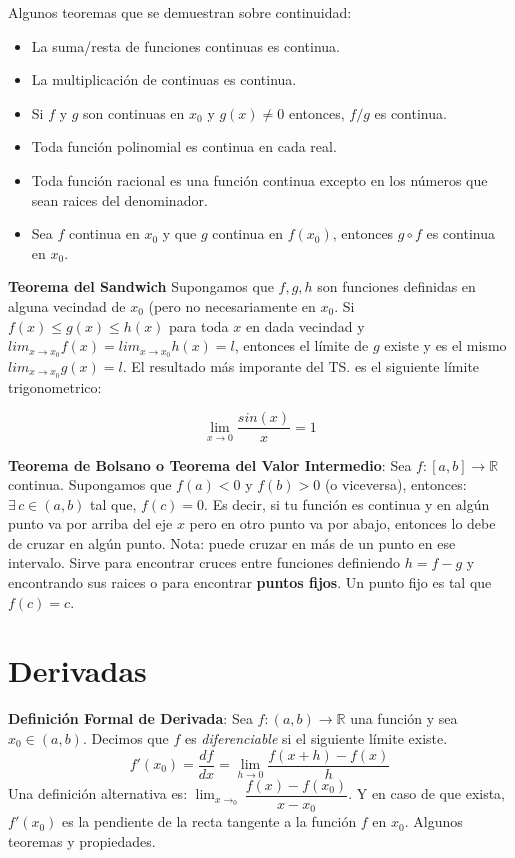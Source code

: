 \documentclass[pdftex,11pt,a4paper]{article}
\begin{document}
\begin{itemize}
Algunos teoremas que se demuestran sobre continuidad:

\begin{itemize}
	\item La suma/resta de funciones continuas es continua.
	\item La multiplicación de continuas es continua.
	\item Si $f$ y $g$ son continuas en $x_0$ y $g(x) \neq 0$ entonces, $f/g$ es continua.
	\item Toda función polinomial es continua en cada real.
	\item Toda función racional es una función continua excepto en los números que sean raices del denominador.
	\item Sea $f$ continua en $x_0$ y que $g$ continua en $f(x_0)$, entonces $g\circ f$ es continua en $x_0$. 
\end{itemize}

\textbf{Teorema del Sandwich} Supongamos que $f,g,h$ son funciones definidas en alguna vecindad de $x_0$ (pero no necesariamente en $x_0$. Si $f(x)\leq g(x) \leq h(x)$ para toda $x$ en dada vecindad y $lim_{x\rightarrow x_0}f(x) = lim_{x\rightarrow x_0}h(x) = l$, entonces el límite de $g$ existe y es el mismo $lim_{x\rightarrow x_0}g(x) = l$. El resultado más imporante del TS. es el siguiente límite trigonometrico:

$$\lim_{x \rightarrow 0} \dfrac{sin(x)}{x} = 1$$

\textbf{Teorema de Bolsano o Teorema del Valor Intermedio}: Sea $f:[a,b]\rightarrow \mathbb{R}$ continua. Supongamos que $f(a)<0$ y $f(b) > 0$ (o viceversa), entonces: $\exists \,c \in (a,b)$ tal que, $f(c) = 0$. Es decir, si tu función es continua y en algún punto va por arriba del eje $x$ pero en otro punto va por abajo, entonces lo debe de cruzar en algún punto. Nota: puede cruzar en más de un punto en ese intervalo.
Sirve para encontrar cruces entre funciones definiendo $h = f-g$ y encontrando sus raices o para encontrar \textbf{puntos fijos}. Un punto fijo es tal que $f(c) = c$.
\end{itemize}

\section{Derivadas}
\textbf{Definición Formal de Derivada}: Sea $f:(a,b)\rightarrow\mathbb{R}$ una función y sea $x_0 \in (a,b)$. Decimos que $f$ es \textit{diferenciable} si el siguiente límite existe. $$f'(x_0) = \dfrac{df}{dx} = \lim_{h\rightarrow 0} \dfrac{f(x+h) - f(x)}{h}$$ Una definición alternativa es: $\lim_{x\rightarrow_0}\dfrac{f(x) - f(x_0)}{x-x_0}$. Y en caso de que exista, $f'(x_0)$ es la pendiente de la recta tangente a la función $f$ en $x_0$. Algunos teoremas y propiedades.
\end{document}
